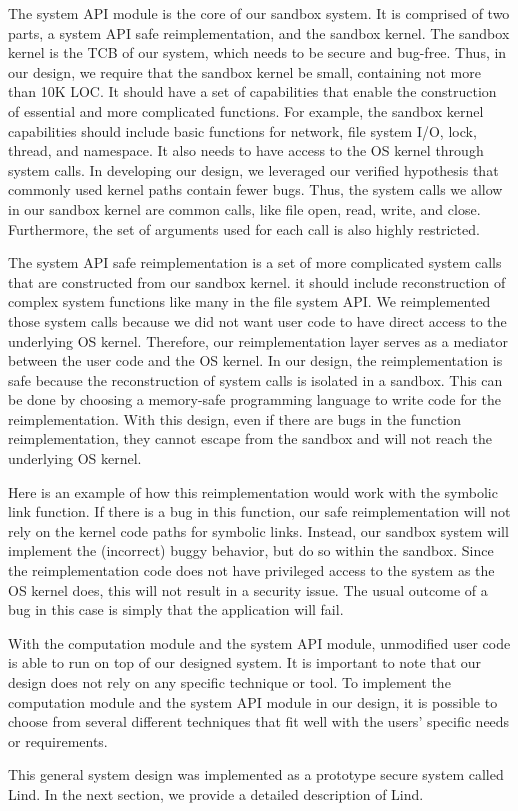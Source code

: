 The system API module is the core of our sandbox system. It is comprised of two parts, 
a system API safe reimplementation, and the sandbox kernel. 
The sandbox kernel is the TCB of our system, which needs to be secure and bug-free. 
Thus, in our design, we require that the sandbox kernel be small, containing not more than 10K LOC. 
It should have a set of capabilities that enable the construction of essential and more complicated functions. 
For example, the sandbox kernel capabilities should include basic functions for network, 
file system I/O, lock, thread, and namespace. It also needs to have access to the OS kernel through system calls. 
In developing our design, we leveraged our verified hypothesis that commonly used kernel paths contain fewer bugs. 
Thus, the system calls we allow in our sandbox kernel are common calls, like file open, read, write, and close. 
Furthermore, the set of arguments used for each call is also highly restricted. 

The system API safe reimplementation is a set of more complicated system calls 
that are constructed from our sandbox kernel. it should include reconstruction of 
complex system functions like many in the file system API. 
We reimplemented those system calls because we did not want user code 
to have direct access to the underlying OS kernel. 
Therefore, our reimplementation layer serves as a mediator between the user code 
and the OS kernel. In our design, the reimplementation is safe 
because the reconstruction of system calls is isolated in a sandbox. 
This can be done by choosing a memory-safe programming language to write code for the reimplementation. 
With this design, even if there are bugs in the function reimplementation, 
they cannot escape from the sandbox and will not reach the underlying OS kernel. 

Here is an example of how this reimplementation would work with the symbolic link function. 
If there is a bug in this function, our safe reimplementation will not rely on the kernel code paths for symbolic links. 
Instead, our sandbox system will implement the (incorrect) buggy behavior, but do so within the sandbox. 
Since the reimplementation code does not have privileged access to the system as the OS kernel does, 
this will not result in a security issue. The usual outcome of a bug in this case is simply that the application will fail.

With the computation module and the system API module, unmodified user code is able to run on top of our designed system. 
It is important to note that our design does not rely on any specific technique or tool. 
To implement the computation module and the system API module in our design, 
it is possible to choose from several different techniques that fit well with the users' specific needs or requirements.

This general system design was implemented as a prototype secure system called Lind. 
In the next section, we provide a detailed description of Lind.
